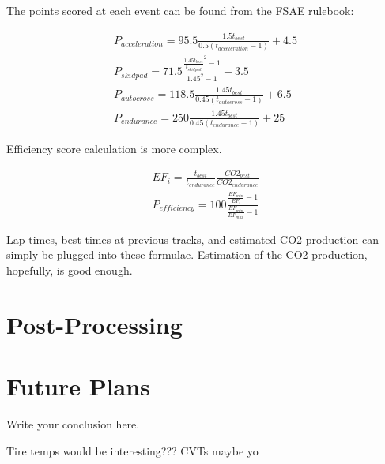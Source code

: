 \documentclass{article}
\begin{document}
The points scored at each event can be found from the FSAE rulebook:

\begin{align}
	P_{acceleration} = 95.5 \frac{1.5 t_{best}}{0.5 (t_{acceleration} - 1)} + 4.5 \\
	P_{skidpad} = 71.5 \frac{\frac{1.45 t_{best}}{t_{skidpad}}^2 -1}{1.45^2 - 1} + 3.5 \\
	P_{autocross} = 118.5 \frac{1.45 t_{best}}{0.45 (t_{autocross} - 1)} + 6.5 \\
	P_{endurance} = 250 \frac{1.45 t_{best}}{0.45 (t_{endurance} - 1)} + 25
\end{align}

Efficiency score calculation is more complex.

\begin{align}
	EF_i = \frac{t_{best}}{t_{endurance}} \frac{CO2_{best}}{CO2_{endurance}} \\
	P_{efficiency} = 100 \frac{\frac{EF_{min}}{EF_i}-1}{\frac{EF_{min}}{EF_{max}}-1}
\end{align}

Lap times, best times at previous tracks, and estimated CO2 production can simply be plugged into these formulae. Estimation of the CO2 production, hopefully, is good enough.

\section{Post-Processing}

\section{Future Plans}
Write your conclusion here.

Tire temps would be interesting???
CVTs maybe yo
\end{document}
